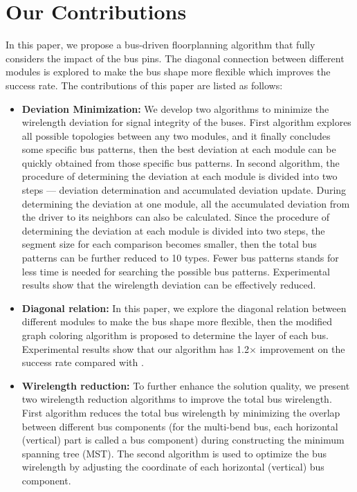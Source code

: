 \section{Our Contributions}
\label{sec::Our Contributions}
In this paper, we propose a bus-driven
floorplanning algorithm that fully considers the impact of the
bus pins. The diagonal connection between
different modules is explored to make the bus shape more flexible which improves
the success rate.
The contributions of this paper are listed as follows:\\
\begin{itemize}
\item \textbf{Deviation Minimization:}
We develop two algorithms to
minimize the wirelength deviation for signal integrity of the buses.
First algorithm explores all possible topologies between any two modules,
and it finally concludes some specific bus patterns,
then the best deviation at each module can be quickly obtained from
those specific bus patterns.
In second algorithm, the procedure of determining the deviation at
each module is divided into two steps --- deviation determination and
accumulated deviation update.
During determining the deviation at one module, all the accumulated deviation
from the driver to its neighbors can also be calculated.
Since the procedure of determining the deviation at each module
is divided into two steps, the segment size for each comparison
becomes smaller, then the total bus patterns can be further reduced to 10 types.
Fewer bus patterns stands for less time is needed for searching the possible bus patterns.
Experimental results show that the wirelength deviation can be effectively reduced.

\item \textbf{Diagonal relation:}
In this paper, we explore the diagonal relation between different
modules to make the bus shape more flexible, then the modified
graph coloring algorithm is proposed to determine the layer of each
bus. Experimental results show that our algorithm has
1.2$\times$ improvement on the success rate compared with
\cite{Ma08}.

\item \textbf{Wirelength reduction:}
To further enhance the solution quality, we present two wirelength
reduction algorithms to improve the total bus wirelength.
First algorithm reduces the total bus wirelength by minimizing the
overlap between different bus components
(for the multi-bend bus, each horizontal (vertical) part is called a bus component)
during constructing the minimum spanning tree (MST).
The second algorithm is used to optimize the bus wirelength by
adjusting the coordinate of each horizontal (vertical) bus component.
\end{itemize}

